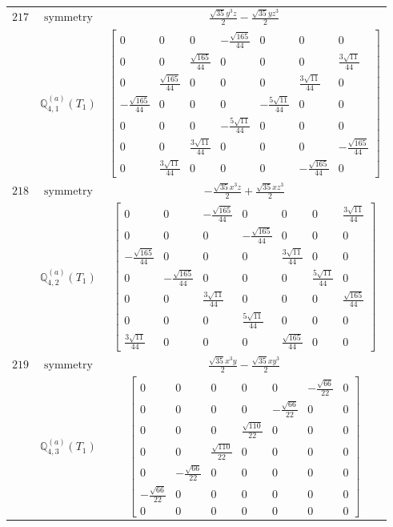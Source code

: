 \documentclass[fleqn,8pt,landscape]{jsarticle}
\begin{document}
\begin{longtable}{ccc}
$ 217 $ & $ \text{symmetry} $ & $ \frac{\sqrt{35} y^{3} z}{2} - \frac{\sqrt{35} y z^{3}}{2} $ \\
$  $ & $ \mathbb{Q}_{4,1}^{(a)}(T_{1}) $ & $ \begin{bmatrix} 0 & 0 & 0 & - \frac{\sqrt{165}}{44} & 0 & 0 & 0 \\ 0 & 0 & \frac{\sqrt{165}}{44} & 0 & 0 & 0 & \frac{3 \sqrt{11}}{44} \\ 0 & \frac{\sqrt{165}}{44} & 0 & 0 & 0 & \frac{3 \sqrt{11}}{44} & 0 \\ - \frac{\sqrt{165}}{44} & 0 & 0 & 0 & - \frac{5 \sqrt{11}}{44} & 0 & 0 \\ 0 & 0 & 0 & - \frac{5 \sqrt{11}}{44} & 0 & 0 & 0 \\ 0 & 0 & \frac{3 \sqrt{11}}{44} & 0 & 0 & 0 & - \frac{\sqrt{165}}{44} \\ 0 & \frac{3 \sqrt{11}}{44} & 0 & 0 & 0 & - \frac{\sqrt{165}}{44} & 0 \end{bmatrix} $ \\ \hline
$ 218 $ & $ \text{symmetry} $ & $ - \frac{\sqrt{35} x^{3} z}{2} + \frac{\sqrt{35} x z^{3}}{2} $ \\
$  $ & $ \mathbb{Q}_{4,2}^{(a)}(T_{1}) $ & $ \begin{bmatrix} 0 & 0 & - \frac{\sqrt{165}}{44} & 0 & 0 & 0 & \frac{3 \sqrt{11}}{44} \\ 0 & 0 & 0 & - \frac{\sqrt{165}}{44} & 0 & 0 & 0 \\ - \frac{\sqrt{165}}{44} & 0 & 0 & 0 & \frac{3 \sqrt{11}}{44} & 0 & 0 \\ 0 & - \frac{\sqrt{165}}{44} & 0 & 0 & 0 & \frac{5 \sqrt{11}}{44} & 0 \\ 0 & 0 & \frac{3 \sqrt{11}}{44} & 0 & 0 & 0 & \frac{\sqrt{165}}{44} \\ 0 & 0 & 0 & \frac{5 \sqrt{11}}{44} & 0 & 0 & 0 \\ \frac{3 \sqrt{11}}{44} & 0 & 0 & 0 & \frac{\sqrt{165}}{44} & 0 & 0 \end{bmatrix} $ \\ \hline
$ 219 $ & $ \text{symmetry} $ & $ \frac{\sqrt{35} x^{3} y}{2} - \frac{\sqrt{35} x y^{3}}{2} $ \\
$  $ & $ \mathbb{Q}_{4,3}^{(a)}(T_{1}) $ & $ \begin{bmatrix} 0 & 0 & 0 & 0 & 0 & - \frac{\sqrt{66}}{22} & 0 \\ 0 & 0 & 0 & 0 & - \frac{\sqrt{66}}{22} & 0 & 0 \\ 0 & 0 & 0 & \frac{\sqrt{110}}{22} & 0 & 0 & 0 \\ 0 & 0 & \frac{\sqrt{110}}{22} & 0 & 0 & 0 & 0 \\ 0 & - \frac{\sqrt{66}}{22} & 0 & 0 & 0 & 0 & 0 \\ - \frac{\sqrt{66}}{22} & 0 & 0 & 0 & 0 & 0 & 0 \\ 0 & 0 & 0 & 0 & 0 & 0 & 0 \end{bmatrix} $ \\ \hline

\end{longtable}
\end{document}
